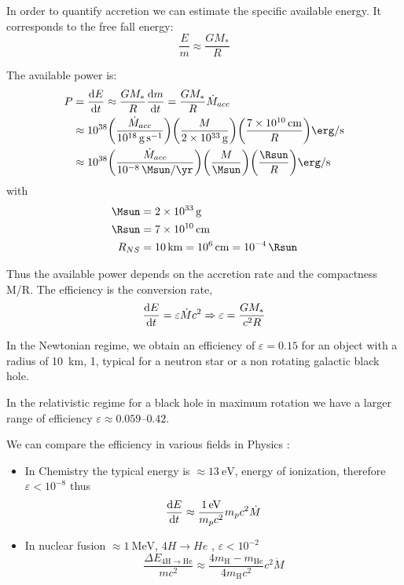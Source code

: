 \documentclass[10pt,a4paper,english]{article}
\let\originalleft\left
\let\originalright\right
\renewcommand{\left}{\mathopen{}\mathclose\bgroup\originalleft}
\renewcommand{\right}{\aftergroup\egroup\originalright}
\begin{document}
In order to quantify accretion we can estimate the specific available energy.
It corresponds to the free fall energy:
\begin{equation*}
    \frac{E}{m} \approx \frac{GM_*}{R}
\end{equation*}

The available power is:
\begin{align*}
    P & = \frac{\d{E}}{\d{t}} \approx \frac{GM_*}{R} \frac{\d{m}}{\d{t}} = \frac{GM_*}{R} \dot{M}_{acc} \\
      & \approx \num{e38} \left(\frac{\dot{M}_{acc}}{\SI{e18}{\g\per\s}}\right) \left(\frac{M}{\SI{2e33}{\g}}\right) \left(\frac{\SI{7e10}{\cm}}{R}\right) \si{\erg\per\s} \\
      & \approx \num{e38} \left(\frac{\dot{M}_{acc}}{\SI{e-8}{\Msun\per\yr}}\right) \left(\frac{M}{\si{\Msun}}\right) \left(\frac{\si{\Rsun}}{R}\right) \si{\erg\per\s}
\end{align*}
with
\begin{align*}
    \si{\Msun} &= \SI{2e33}{\g} \\
    \si{\Rsun} &= \SI{7e10}{\cm} \\
    R_{NS}   &= \SI{10}{\km} = \SI{e6}{\cm} = \SI{e-4}{\Rsun}
\end{align*}

Thus the available power depends on the accretion rate and the compactness M/R.
The efficiency is the conversion rate,
\begin{equation*}
    \frac{\mathrm{d}{E}}{\mathrm{d}{t}} = \varepsilon \dot{M} c^{2} \Rightarrow \varepsilon = \frac{GM_*}{c^{2}R}
\end{equation*}

In the Newtonian regime, we obtain an efficiency of $\varepsilon = 0.15$ for an
object with a radius of \SI{10}{km}, \SI{1}{\Msun}, typical for a neutron star
or a non rotating galactic black hole.

In the relativistic regime for a black hole in maximum rotation we have a
larger range of efficiency $\varepsilon \approx \numrange{0.059}{0.42}$.

We can compare the efficiency in various fields in Physics :
\begin{itemize}
    \item In Chemistry the typical energy is $\approx \SI{13}{\electronvolt}$,
          energy of ionization, therefore $\varepsilon < 10^{-8}$ thus
          \begin{equation*}
              \frac{\mathrm{d}{E}}{\mathrm{d}{t}} \approx \frac{\SI{1}{\electronvolt}}{m_p c^2} m_p c^2 \dot{M}
          \end{equation*}
    \item In nuclear fusion $\approx \SI{1}{\mega\electronvolt}$, $4H \rightarrow He$ , $\varepsilon < 10^{-2}$
          \begin{equation*}
              \frac{\Delta E_{4 \mathrm{H} \rightarrow \mathrm{He}}}{m c^2} \approx \frac{4 m_\mathrm{H} - m_\mathrm{He}}{4 m_\mathrm{H} c^2} c^2 \dot{M}
          \end{equation*}
\end{itemize}
\end{document}
